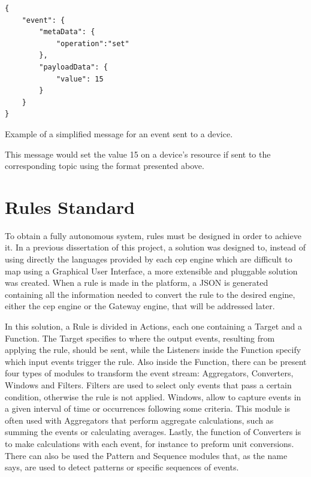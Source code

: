 \begin{listing}[H]
\begin{verbatim}
{
    "event": {
        "metaData": {
            "operation":"set"
        }, 
        "payloadData": {
            "value": 15 
        }
    } 
}

\end{verbatim}
\caption{Example of a simplified message for an event sent to a device.}
\label{snippet:todevice}
\end{listing}

This message would set the value 15 on a device's resource if sent to the corresponding topic using the format presented above.

\section{Rules Standard}
\label{implementation:rules}


To obtain a fully autonomous system, rules must be designed in order to achieve it. In a previous dissertation of this project, a solution was designed to, instead of using directly the languages provided by each \ac{cep} engine which are difficult to map using a Graphical User Interface, a more extensible and pluggable solution was created. When a rule is made in the platform, a JSON is generated containing all the information needed to convert the rule to the desired engine, either the \ac{cep} engine or the Gateway engine, that will be addressed later.

In this solution, a Rule is divided in Actions, each one containing a Target and a Function. The Target specifies to where the output events, resulting from applying the rule, should be sent, while the Listeners inside the Function specify which input events trigger the rule. Also inside the Function, there can be present four types of modules to transform the event stream: Aggregators, Converters, Windows and Filters. Filters are used to select only events that pass a certain condition, otherwise the rule is not applied. Windows, allow to capture events in a given interval of time or occurrences following some criteria. This module is often used with Aggregators that perform aggregate calculations, such as summing the events or calculating averages. Lastly, the function of Converters is to make calculations with each event, for instance to preform unit conversions. There can also be used the Pattern and Sequence modules that, as the name says, are used to detect patterns or specific sequences of events.


